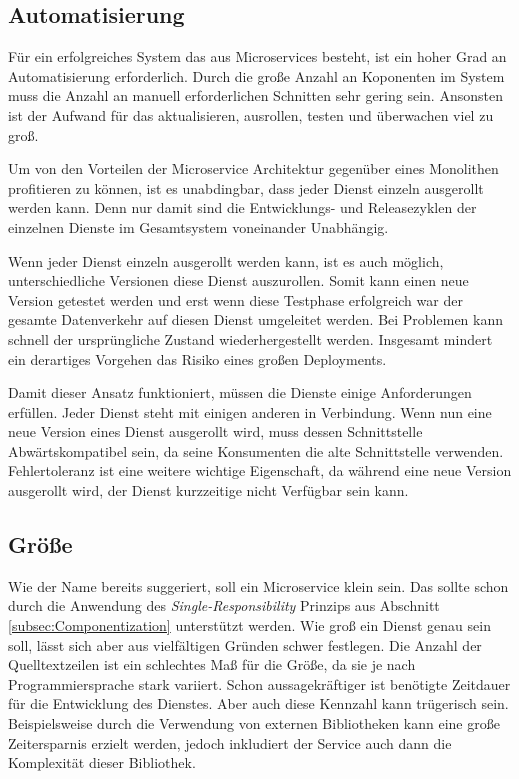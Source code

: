 \subsection{Automatisierung}

Für ein erfolgreiches System das aus Microservices besteht, ist ein hoher Grad an Automatisierung erforderlich. Durch die große Anzahl an Koponenten im System muss die Anzahl an manuell erforderlichen Schnitten sehr gering sein. Ansonsten ist der Aufwand für das aktualisieren, ausrollen, testen und überwachen viel zu groß.

Um von den Vorteilen der Microservice Architektur gegenüber eines Monolithen profitieren zu können, ist es unabdingbar, dass jeder Dienst einzeln ausgerollt werden kann. Denn nur damit sind die Entwicklungs- und Releasezyklen der einzelnen Dienste im Gesamtsystem voneinander Unabhängig.

Wenn jeder Dienst einzeln ausgerollt werden kann, ist es auch möglich, unterschiedliche Versionen diese Dienst auszurollen. Somit kann einen neue Version getestet werden und erst wenn diese Testphase erfolgreich war der gesamte Datenverkehr auf diesen Dienst umgeleitet werden. Bei Problemen kann schnell der ursprüngliche Zustand wiederhergestellt werden. Insgesamt mindert ein derartiges Vorgehen das Risiko eines großen Deployments.

Damit dieser Ansatz funktioniert, müssen die Dienste einige Anforderungen erfüllen. Jeder Dienst steht mit einigen anderen in Verbindung. Wenn nun eine neue Version eines Dienst ausgerollt wird, muss dessen Schnittstelle Abwärtskompatibel sein, da seine Konsumenten die alte Schnittstelle verwenden. Fehlertoleranz ist eine weitere wichtige Eigenschaft, da während eine neue Version ausgerollt wird, der Dienst kurzzeitige nicht Verfügbar sein kann.

\subsection{Größe}

Wie der Name bereits suggeriert, soll ein Microservice klein sein. Das sollte schon durch die Anwendung des \textit{Single-Responsibility} Prinzips aus Abschnitt \ref{subsec:Componentization} unterstützt werden. Wie groß ein Dienst genau sein soll, lässt sich aber aus vielfältigen Gründen schwer festlegen. Die Anzahl der Quelltextzeilen ist ein schlechtes Maß für die Größe, da sie je nach Programmiersprache stark variiert. Schon aussagekräftiger ist benötigte Zeitdauer für die Entwicklung des Dienstes. Aber auch diese Kennzahl kann trügerisch sein. Beispielsweise durch die Verwendung von externen Bibliotheken kann eine große Zeitersparnis erzielt werden, jedoch inkludiert der Service auch dann die Komplexität dieser Bibliothek.


